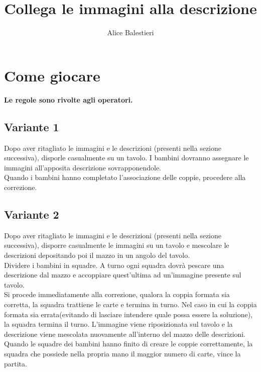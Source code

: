 \documentclass[hidelinks,12pt,a4paper]{article}
\begin{document}
	
	\title{\textbf{\\Collega le immagini alla descrizione}}
	\author{Alice Balestieri}
	\date{}
	
	\maketitle
	\newpage
	
	\tableofcontents
	\newpage
	
	\section{Come giocare}
	\begin{center}
		\textbf{Le regole sono rivolte agli operatori.}
	\end{center}
	
	\subsection{Variante 1}
	 Dopo aver ritagliato le immagini e le descrizioni (presenti nella sezione successiva), disporle casualmente su un tavolo. I bambini dovranno assegnare le immagini all'apposita descrizione sovrapponendole.\\
	Quando i bambini hanno completato l'associazione delle coppie, procedere alla correzione.
	
	\subsection{Variante 2}
	Dopo aver ritagliato le immagini e le descrizioni (presenti nella sezione successiva), disporre casualmente le immagini su un tavolo e mescolare le descrizioni depositando poi il mazzo in un angolo del tavolo.\\
	Dividere i bambini in squadre. A turno ogni squadra dovrà pescare una descrizione dal mazzo e accoppiare quest'ultima ad un'immagine presente sul tavolo.\\
	Si procede immediatamente alla correzione, qualora la coppia formata sia corretta, la squadra trattiene le carte e termina in turno. Nel caso in cui la coppia formata sia errata(evitando di lasciare intendere quale possa essere la soluzione), la squadra termina il turno. L'immagine viene riposizionata sul tavolo e la descrizione viene mescolata nuovamente all'interno del mazzo delle descrizioni.\\
	Quando le squadre dei bambini hanno finito di creare le coppie correttamente, la squadra che possiede nella propria mano il maggior numero di carte, vince la partita.
	
\end{document}
